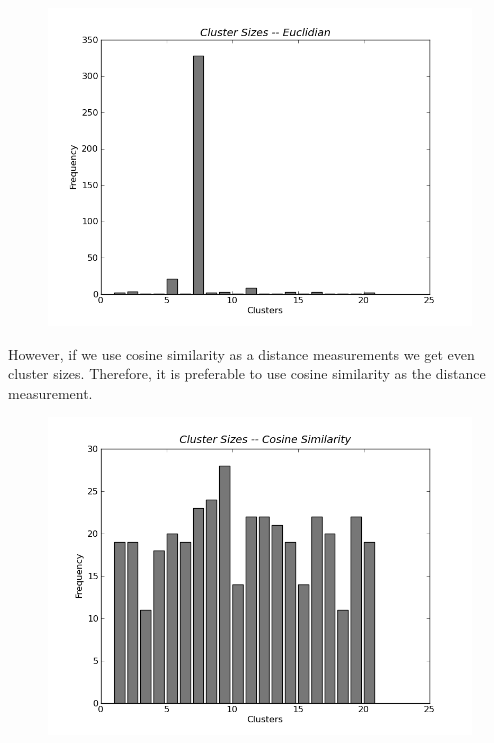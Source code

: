 \begin{figure}[h]
  \includegraphics[width=\linewidth]{./figs/euclidian.png}
  \label{fig:euclidian}
\end{figure}

However, if we use cosine similarity as a distance measurements we get even
cluster sizes. Therefore, it is preferable to use cosine similarity as
the distance measurement.

\begin{figure}[h]
  \includegraphics[width=\linewidth]{./figs/cosine.png}
  \label{fig:cosine}
\end{figure}
